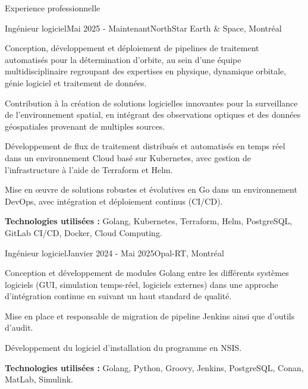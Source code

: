 \documentclass[
	10pt, %
]{resume} %
\begin{document}

\begin{rSection}{Experience professionnelle}

	\begin{rSubsection}{Ingénieur logiciel}{Mai 2025 - Maintenant}{NorthStar Earth \& Space, Montréal}{}
		\item Conception, développement et déploiement de pipelines de traitement automatisés pour la détermination d’orbite, au sein d’une équipe multidisciplinaire regroupant des expertises en physique, dynamique orbitale, génie logiciel et traitement de données.
		\item Contribution à la création de solutions logicielles innovantes pour la surveillance de l’environnement spatial, en intégrant des observations optiques et des données géospatiales provenant de multiples sources.
		\item Développement de flux de traitement distribués et automatisés en temps réel dans un environnement Cloud basé sur Kubernetes, avec gestion de l’infrastructure à l’aide de Terraform et Helm.
		\item Mise en œuvre de solutions robustes et évolutives en Go dans un environnement DevOps, avec intégration et déploiement continus (CI/CD).
		\item \textbf{Technologies utilisées : }Golang, Kubernetes, Terraform, Helm, PostgreSQL, GitLab CI/CD, Docker, Cloud Computing.
	\end{rSubsection}

	\begin{rSubsection}{Ingénieur logiciel}{Janvier 2024 - Mai 2025}{Opal-RT, Montréal}{}
		\item Conception et développement de modules Golang entre les différents systèmes logiciels (GUI, simulation temps-réel, logiciels externes) dans une approche d'intégration continue en suivant un haut standard de qualité.
		\item Mise en place et responsable de migration de pipeline Jenkins ainsi que d'outils d'audit.
		\item Développement du logiciel d'installation du programme en NSIS.
		\item \textbf{Technologies utilisées : }Golang, Python, Groovy, Jenkins, PostgreSQL, Conan, MatLab, Simulink.
	\end{rSubsection}


\end{rSection}
\end{document}
